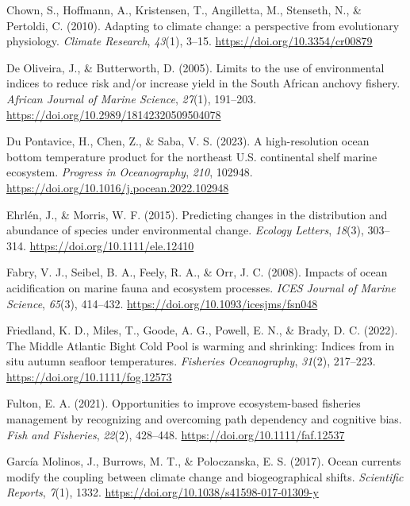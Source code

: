 \documentclass[
  12pt,
]{article}
\newlength{\cslhangindent}
\newenvironment{CSLReferences}[2] %
 {\begin{list}{}{%
  \setlength{\itemindent}{0pt}
  \setlength{\leftmargin}{0pt}
  \setlength{\parsep}{0pt}
  \ifodd #1
   \setlength{\leftmargin}{\cslhangindent}
   \setlength{\itemindent}{-1\cslhangindent}
  \fi
  \setlength{\itemsep}{#2\baselineskip}}}
 {\end{list}}
\begin{document}
\begin{CSLReferences}{1}{2}
Chown, S., Hoffmann, A., Kristensen, T., Angilletta, M., Stenseth, N., \& Pertoldi, C. (2010). Adapting to climate change: a perspective from evolutionary physiology. \emph{Climate Research}, \emph{43}(1), 3--15. \url{https://doi.org/10.3354/cr00879}

De Oliveira, J., \& Butterworth, D. (2005). Limits to the use of environmental indices to reduce risk and/or increase yield in the {South African} anchovy fishery. \emph{African Journal of Marine Science}, \emph{27}(1), 191--203. \url{https://doi.org/10.2989/18142320509504078}

Du Pontavice, H., Chen, Z., \& Saba, V. S. (2023). A high-resolution ocean bottom temperature product for the northeast U.S. continental shelf marine ecosystem. \emph{Progress in Oceanography}, \emph{210}, 102948. \url{https://doi.org/10.1016/j.pocean.2022.102948}

Ehrlén, J., \& Morris, W. F. (2015). Predicting changes in the distribution and abundance of species under environmental change. \emph{Ecology Letters}, \emph{18}(3), 303--314. \url{https://doi.org/10.1111/ele.12410}

Fabry, V. J., Seibel, B. A., Feely, R. A., \& Orr, J. C. (2008). Impacts of ocean acidification on marine fauna and ecosystem processes. \emph{ICES Journal of Marine Science}, \emph{65}(3), 414--432. \url{https://doi.org/10.1093/icesjms/fsn048}

Friedland, K. D., Miles, T., Goode, A. G., Powell, E. N., \& Brady, D. C. (2022). The Middle Atlantic Bight Cold Pool is warming and shrinking: Indices from in situ autumn seafloor temperatures. \emph{Fisheries Oceanography}, \emph{31}(2), 217--223. \url{https://doi.org/10.1111/fog.12573}

Fulton, E. A. (2021). Opportunities to improve ecosystem{-}based fisheries management by recognizing and overcoming path dependency and cognitive bias. \emph{Fish and Fisheries}, \emph{22}(2), 428--448. \url{https://doi.org/10.1111/faf.12537}

García Molinos, J., Burrows, M. T., \& Poloczanska, E. S. (2017). Ocean currents modify the coupling between climate change and biogeographical shifts. \emph{Scientific Reports}, \emph{7}(1), 1332. \url{https://doi.org/10.1038/s41598-017-01309-y}


\end{CSLReferences}
\end{document}
